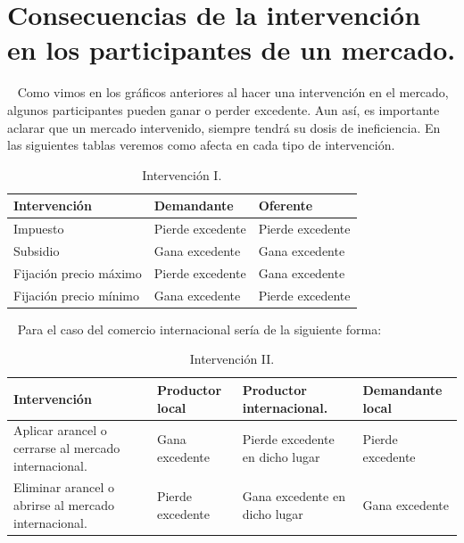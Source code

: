\documentclass[
  letterpaper,
  DIV=11,
  numbers=noendperiod]{scrreport}
\begin{document}
\hypertarget{consecuencias-de-la-intervenciuxf3n-en-los-participantes-de-un-mercado.}{%
\section{Consecuencias de la intervención en los participantes de un
mercado.}\label{consecuencias-de-la-intervenciuxf3n-en-los-participantes-de-un-mercado.}}

~ Como vimos en los gráficos anteriores al hacer una intervención en el
mercado, algunos participantes pueden ganar o perder excedente. Aun así,
es importante aclarar que un mercado intervenido, siempre tendrá su
dosis de ineficiencia. En las siguientes tablas veremos como afecta en
cada tipo de intervención.

\begin{table}[H]
    \centering
    \begin{tabular}{|p{45mm}|p{30mm}|p{30mm}|}
        \hline
        Intervención & Demandante & Oferente \\
        \hline
        Impuesto & Pierde excedente & Pierde excedente \\
        \hline
        Subsidio & Gana excedente & Gana excedente \\
        \hline
        Fijación precio máximo & Pierde excedente & Gana excedente \\
        \hline
        Fijación precio mínimo & Gana excedente & Pierde excedente \\
        \hline
    \end{tabular}
    \caption{Intervención I.}
    
\end{table}

~ Para el caso del comercio internacional sería de la siguiente forma:

\begin{table}[H]
    \centering
    \begin{tabular}{|p{48mm}|p{30mm}|p{30mm}|p{30mm}|}
        \hline
        Intervención & Productor local & Productor internacional. & Demandante local \\
        \hline
        Aplicar arancel o cerrarse al mercado internacional. & Gana excedente & Pierde excedente en dicho lugar & Pierde excedente \\
        \hline
        Eliminar arancel o abrirse al mercado internacional. & Pierde excedente & Gana excedente en dicho lugar & Gana excedente \\
        \hline
    \end{tabular}
    \caption{Intervención II.}
    
\end{table}
\end{document}
